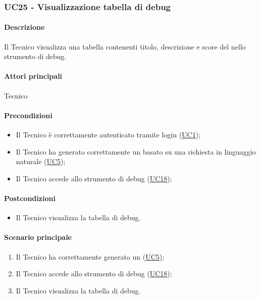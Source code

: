 \subsubsection{UC25 - Visualizzazione tabella di debug}\label{UC25}
\paragraph*{Descrizione}
Il Tecnico visualizza una tabella contenenti titolo, descrizione e score del  nello strumento di debug. 

\paragraph*{Attori principali}
Tecnico

\paragraph*{Precondizioni}
\begin{itemize}
  \item Il Tecnico è correttamente autenticato tramite login (\hyperref[UC1]{UC1});
  \item Il Tecnico ha generato correttamente un  basato su una richiesta in linguaggio naturale (\hyperref[UC5]{UC5});
  \item Il Tecnico accede allo strumento di debug (\hyperref[UC18]{UC18});
\end{itemize}

\paragraph*{Postcondizioni}
\begin{itemize}
  \item Il Tecnico visualizza la tabella di debug.
\end{itemize}

\paragraph*{Scenario principale}
\begin{enumerate}
  \item Il Tecnico ha correttamente generato un  (\hyperref[UC5]{UC5});
  \item Il Tecnico accede allo strumento di debug (\hyperref[UC18]{UC18});
  \item Il Tecnico visualizza la tabella di debug.
\end{enumerate}

